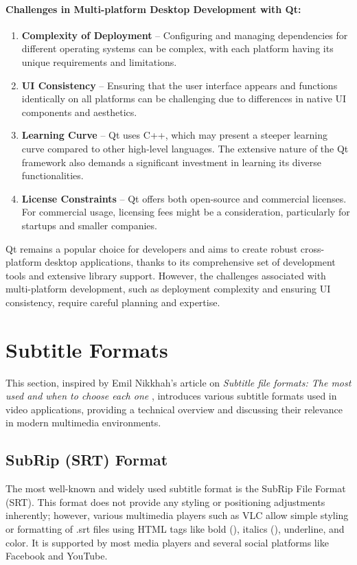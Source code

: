 \paragraph{Challenges in Multi-platform Desktop Development with Qt:}
\begin{enumerate}
    \item \textbf{Complexity of Deployment}  --
    Configuring and managing dependencies for different operating systems can be complex, with each platform having its unique requirements and limitations.
    \item \textbf{UI Consistency}  --
    Ensuring that the user interface appears and functions identically on all platforms can be challenging due to differences in native UI components and aesthetics.
    \item \textbf{Learning Curve}  --
    Qt uses C++, which may present a steeper learning curve compared to other high-level languages. The extensive nature of the Qt framework also demands a significant investment in learning its diverse functionalities.
    \item \textbf{License Constraints}  --
    Qt offers both open-source and commercial licenses. For commercial usage, licensing fees might be a consideration, particularly for startups and smaller companies.
\end{enumerate}

Qt remains a popular choice for developers and aims to create robust cross-platform desktop applications, thanks to its comprehensive set of development tools and extensive library support. However, the challenges associated with multi-platform development, such as deployment complexity and ensuring UI consistency, require careful planning and expertise. 

\newpage
\section{Subtitle Formats}
\label{theory:formats}

This section, inspired by Emil Nikkhah's article on \textit{Subtitle file formats: The most used and when to choose each one} \cite{Nikkhah2023}, introduces various subtitle formats used in video applications, providing a technical overview and discussing their relevance in modern multimedia environments.

\subsection{SubRip (SRT) Format}
The most well-known and widely used subtitle format is the SubRip File Format (SRT). This format does not provide any styling or positioning adjustments inherently; however, various multimedia players such as VLC allow simple styling or formatting of .srt files using HTML tags like bold (\textbf{}), italics (\textit{}), underline, and color. It is supported by most media players and several social platforms like Facebook and YouTube. 

